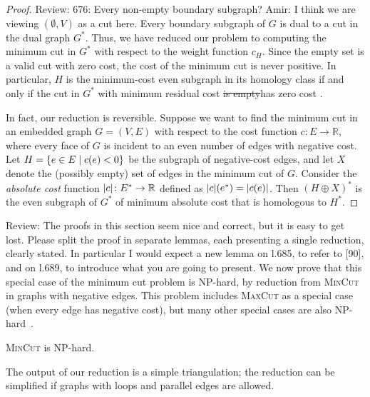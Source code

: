 \documentclass[letterpaper,review]{siamart190516}
\def\Real{\mathbb{R}}
\def\modified#1{\color{blue}#1 \color{black}}
\def\anote#1{\color{purple}Amir: #1 \color{black}}
\def\rnote#1{\color{red}Review: #1 \color{black}}
\begin{document}
{\begin{proof}
\rnote{676: Every non-empty boundary subgraph?}\anote{I think we are viewing $(\emptyset, V)$ as a cut here.}
Every boundary subgraph of $G$ is dual to a cut in the dual graph $G^*$.  Thus, we have reduced our problem to computing the minimum cut in $G^*$ with respect to the weight function $c_H$.  Since the empty set is a valid cut with zero cost, the cost of the minimum cut is never positive.  In particular, $H$ is the minimum-cost even subgraph in its homology class if and only if the cut in $G^*$ with minimum residual cost \sout{is empty}\modified{has zero cost}.

In fact, our reduction is reversible.  Suppose we want to find the minimum cut in an embedded graph $G = (V, E)$ with respect to the cost function $c\colon E\to \Real$, where every face of $G$ is incident to an even number of edges with negative cost.  Let $H = \{ {e\in E}\mid {c(e)<0} \}$ be the subgraph of negative-cost edges, and let $X$ denote the (possibly empty) set of edges in the minimum cut of $G$.  Consider the \emph{absolute cost} function $\abs{c}\colon E^*\to \Real$ defined as $\mathopen| c \mathclose|(e^*) = \mathopen| c(e) \mathclose|$.  Then $(H\oplus X)^*$ is the even subgraph of $G^*$ of minimum absolute cost that is homologous to $H^*$.
\end{proof}

\rnote{
The proofs in this section seem nice and correct, but it is easy to get lost. Please split the proof in separate lemmas, each presenting a single reduction, clearly stated. In particular I would expect a new lemma on l.685, to refer to [90], and on l.689, to introduce what you are going to present. 
}
\color{blue}
We now prove that this special case of the minimum cut problem is {NP}-hard, by  reduction from \textsc{MinCut} in graphs with negative edges.  This problem includes \textsc{MaxCut} as a special case (when every edge has negative cost), but many other special cases are also {NP}-hard~\cite{mrr-edofm-03}.

\begin{lemma}
\textsc{MinCut} is NP-hard.
\end{lemma}

The output of our reduction is a simple triangulation; the reduction can be simplified if graphs with loops and parallel edges are allowed.

}
\end{document}
